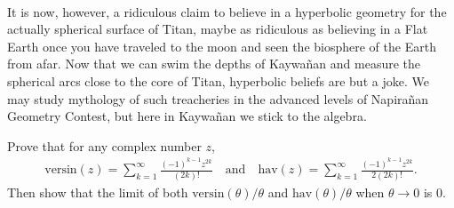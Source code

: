 \documentclass[12pt,a4paper]{memoir}
\theoremstyle{definition}
\begin{document}
\begin{tcolorbox}[title={Swimming the Depths of the Algebraic Ocean}]
	\\
	It is now, however, a ridiculous claim to believe in a hyperbolic geometry for the actually spherical surface of Titan, maybe as ridiculous as believing in a Flat Earth once you have traveled to the moon and seen the biosphere of the Earth from afar. Now that we can swim the depths of Kaywañan and measure the spherical arcs close to the core of Titan, hyperbolic beliefs are but a joke. We may study mythology of such treacheries in the advanced levels of Napirañan Geometry Contest, but here in Kaywañan we stick to the algebra.
\end{tcolorbox}



	\begin{question}[name={Maclaurin Series of Versine \& Haversine}]
		Prove that for any complex number $z$,
		\begin{align*}
			\text{versin}(z) = \sum _{k=1}^{\infty }{\frac {(-1)^{k-1}z^{2k}}{(2k)!}} \quad \text{and} \quad \text{hav}(z) = \sum _{k=1}^{\infty }{\frac {(-1)^{k-1}z^{2k}}{2(2k)!}}.
		\end{align*}
		Then show that the limit of both $\text{versin}(\theta)/\theta$ and $\text{hav}(\theta)/\theta$ when $\theta \to 0$ is $0$.
	\end{question}
\end{document}
